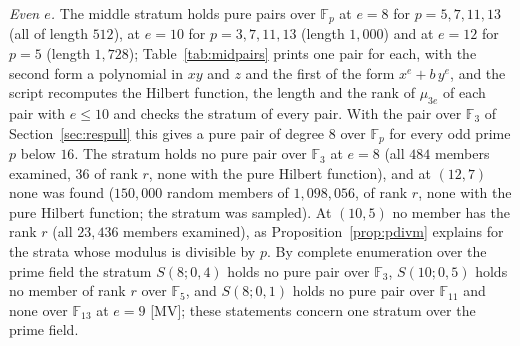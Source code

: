 \documentclass[11pt]{article}
\theoremstyle{definition}
\theoremstyle{remark}
\newcommand{\F}{\mathbb{F}}
\begin{document}
\begin{table}[htbp]
\centering\scriptsize

\caption{The cases of the search in the middle stratum and at $e=9$: the family (K controls, V middle stratum, W the strata at $e=9$), $(e,p)$, the stratum, the number of members, the number examined, whether all members were taken, the enumeration was cut by the early stop or the members were sampled, the members of rank $r$, with the pure Hilbert function and with the pure Betti table.}
\label{tab:mid}
\end{table}

\emph{Even $e$.} The middle stratum holds pure pairs over $\F_p$ at $e=8$ for $p=5,7,11,13$ (all of length $512$), at $e=10$ for $p=3,7,11,13$ (length $1{,}000$) and at $e=12$ for $p=5$ (length $1{,}728$); Table~\ref{tab:midpairs} prints one pair for each, with the second form a polynomial in $xy$ and $z$ and the first of the form $x^e+b\,y^e$, and the script recomputes the Hilbert function, the length and the rank of $\mu_{3e}$ of each pair with $e\le10$ and checks the stratum of every pair. With the pair over $\F_3$ of Section~\ref{sec:respull} this gives a pure pair of degree $8$ over $\F_p$ for every odd prime $p$ below $16$. The stratum holds no pure pair over $\F_3$ at $e=8$ (all $484$ members examined, $36$ of rank $r$, none with the pure Hilbert function), and at $(12,7)$ none was found ($150{,}000$ random members of $1{,}098{,}056$, \nmidTwelveSevenRankR{} of rank $r$, none with the pure Hilbert function; the stratum was sampled). At $(10,5)$ no member has the rank $r$ (all $23{,}436$ members examined), as Proposition~\ref{prop:pdivm} explains for the strata whose modulus is divisible by $p$. By complete enumeration over the prime field the stratum $S(8;0,4)$ holds no pure pair over $\F_3$, $S(10;0,5)$ holds no member of rank $r$ over $\F_5$, and $S(8;0,1)$ holds no pure pair over $\F_{11}$ and none over $\F_{13}$ at $e=9$ [MV]; these statements concern one stratum over the prime field.

\begin{table}[htbp]
\centering\footnotesize

\caption{One pure pair found in the middle stratum or in a stratum at $e=9$ for each pair $(e,p)$ settled by that search: the stratum, the forms over $\F_p$ (coefficients of least absolute value) and the length of $U/(Uf+Ug)$ (equal to $e^3$); the script checks the stratum of each pair and recomputes the Hilbert function, the length and the rank of $\mu_{3e}$ for $e\le10$, and both instruments give the Betti table $(1,2,2,1)$ on $(0,e,3e,4e)$.}
\label{tab:midpairs}
\end{table}
\end{document}
